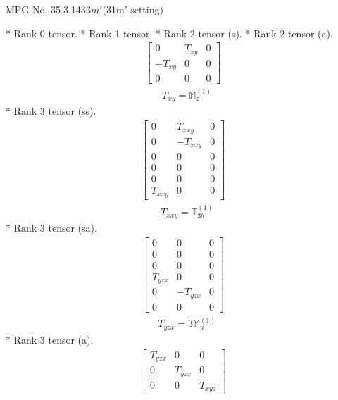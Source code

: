 \documentclass[fleqn,8pt,landscape]{jsarticle}
\begin{document}
\setcounter{MaxMatrixCols}{32}

\renewcommand{\tablename}{Table~}
\renewcommand{\figurename}{Figure~}
\begin{center}
\LARGE
MPG No. 35.3.143\quad$3m'$\quad(31m' setting)
\end{center}
* Rank 0 tensor.
* Rank 1 tensor.
* Rank 2 tensor (s).
* Rank 2 tensor (a).
\begin{align*}
\begin{bmatrix} 0 & T_{xy} & 0 \\ - T_{xy} & 0 & 0 \\ 0 & 0 & 0 \end{bmatrix}
\end{align*}
\begin{align*}
& T_{xy} = \mathbb{M}_{z}^{(1)}
\end{align*}
* Rank 3 tensor (ss).
\begin{align*}
\begin{bmatrix} 0 & T_{xxy} & 0 \\ 0 & - T_{xxy} & 0 \\ 0 & 0 & 0 \\ 0 & 0 & 0 \\ 0 & 0 & 0 \\ T_{xxy} & 0 & 0 \end{bmatrix}
\end{align*}
\begin{align*}
& T_{xxy} = \mathbb{T}_{3b}^{(1)}
\end{align*}
* Rank 3 tensor (sa).
\begin{align*}
\begin{bmatrix} 0 & 0 & 0 \\ 0 & 0 & 0 \\ 0 & 0 & 0 \\ T_{yzx} & 0 & 0 \\ 0 & - T_{yzx} & 0 \\ 0 & 0 & 0 \end{bmatrix}
\end{align*}
\begin{align*}
& T_{yzx} = 3 \mathbb{M}_{u}^{(1)}
\end{align*}
* Rank 3 tensor (a).
\begin{align*}
\begin{bmatrix} T_{yzx} & 0 & 0 \\ 0 & T_{yzx} & 0 \\ 0 & 0 & T_{xyz} \end{bmatrix}
\end{align*}
\end{document}
